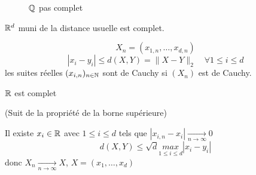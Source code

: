 \begin{figure}[H]
    \centering
    \caption{$\mathbb{Q}$ pas complet}
    \label{fig:q_not_complete}
\end{figure}
\begin{prop}\label{prop:rd-est-complet}
   $\mathbb{R}^d$ muni de la distance usuelle est complet. 
\end{prop}
\begin{preuve}
   \[
   X_n = (x_{1,n}, \ldots, x_{d,n})
   \]  
   \[
   |x_i - y_i| \le d(X, Y) = \|X - Y\|_2 \quad \forall 1 \le i \le d
   \] 
   les suites réelles $(x_{i,n})_{n \in \mathbb{N}}$ sont de Cauchy si $(X_n)$ est de Cauchy.
\end{preuve}
\begin{property}
   $\mathbb{R}$ est complet 
\end{property}
\begin{preuve}
    (Suit de la propriété de la borne supérieure) 
    \par
    Il existe $x_i \in \mathbb{R}$ avec $1 \le i \le d$ tels que $|x_{i,n} - x_{i}| \xrightarrow[n \to \infty]{} 0$
    \[
        d(X, Y) \le \sqrt{d} \underset{1 \le i \le d}{max} |x_i - y_i| 
    \] 
    donc $X_n \xrightarrow[n \to \infty]{} X$, $X = (x_1, \ldots, x_d)$
\end{preuve}
